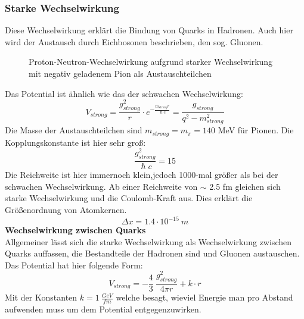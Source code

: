 \documentclass[Ex4_Zusammenfassung.tex]{subfiles}
\begin{document}
\subsubsection*{Starke Wechselwirkung}
Diese Wechselwirkung erklärt die Bindung von Quarks in Hadronen. Auch hier wird der Austausch durch Eichbosonen beschrieben, den sog. Gluonen. 
\begin{figure}[H]
\centering
{}
					\caption{Proton-Neutron-Wechselwirkung aufgrund starker Wechselwirkung mit negativ geladenem Pion als Austauschteilchen}
\end{figure}
Das Potential ist ähnlich wie das der schwachen Wechselwirkung:
\begin{equation}
V_{strong} = \frac{g_{strong}^2}{r} \cdot e^{-\frac{m_{strong} r}{\hslash c}} = \frac{g_{strong}}{q^2 - m_{strong}^2}
\end{equation}
Die Masse der Austauschteilchen sind  $ m_{strong} = m_{\pi} = 140 $ MeV für Pionen. \newline
Die Kopplungskonstante ist hier sehr groß:
\begin{equation}
\frac{g_{strong}^2}{\hslash c } = 15 
\end{equation}
Die Reichweite ist hier immernoch klein,jedoch 1000-mal größer als bei der schwachen Wechselwirkung. Ab einer Reichweite von $ \sim $ 2.5 fm gleichen sich starke Wechselwirkung und die Coulomb-Kraft aus. Dies erklärt die Größenordnung von Atomkernen. 
\begin{equation}
\Delta x = 1.4 \cdot 10^{-15} \ m 
\end{equation}
\newpage
\textbf{Wechselwirkung zwischen Quarks} \\ \newline
Allgemeiner lässt sich die starke Wechselwirkung als Wechselwirkung zwischen Quarks auffassen, die Bestandteile der Hadronen sind und Gluonen austauschen. Das Potential hat hier folgende Form: 
\begin{equation}
V_{strong} = - \frac{4}{3} \  \frac{g_{strong}^2}{4 \pi r} + k \cdot r 
\end{equation}
Mit der Konstanten $ k = 1 \  \frac{GeV}{fm} $ welche besagt, wieviel Energie man pro Abstand aufwenden muss um dem Potential entgegenzuwirken. 
\end{document}

